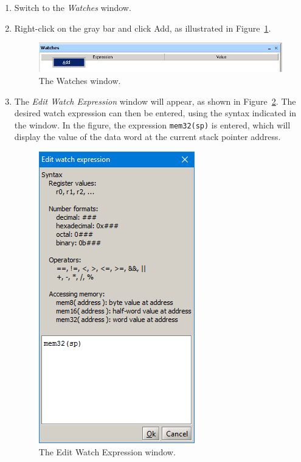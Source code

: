 \documentclass[11pt, twoside, pdftex]{article}
\begin{document}
\begin{enumerate}
\item Switch to the {\it Watches} window.

\item Right-click on the gray bar and click \textsf{Add},
as illustrated in Figure~\ref{fig:46}.

\begin{figure}[H]
   \begin{center}
      \includegraphics[scale=0.6]{screenshots/figure46.png}
   \end{center}
   \caption{The Watches window.}
	 \label{fig:46}
\end{figure}

\item The {\it Edit Watch Expression} window will appear, as
shown in Figure~\ref{fig:47}. The desired watch expression can then be
entered, using the syntax indicated in the window. In the figure,
the expression \texttt{mem32(sp)} is entered, which will display
the value of the data word at the current stack pointer address.

\begin{figure}[H]
   \begin{center}
      \includegraphics[scale=0.6]{screenshots/figure47.png}
   \end{center}
   \caption{The Edit Watch Expression window.}
	 \label{fig:47}
\end{figure}


\end{enumerate}
\end{document}
